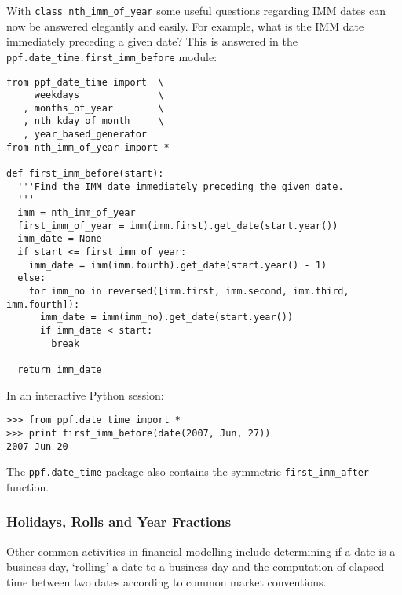 With \verb|class nth_imm_of_year| some useful questions regarding IMM
dates can now be answered elegantly and easily. For example, what is
the IMM date immediately preceding a given date? This is answered in
the \\ \verb|ppf.date_time.first_imm_before| module:
\begin{verbatim}
from ppf_date_time import  \
     weekdays              \
   , months_of_year        \
   , nth_kday_of_month     \
   , year_based_generator
from nth_imm_of_year import *

def first_imm_before(start):
  '''Find the IMM date immediately preceding the given date.
  '''
  imm = nth_imm_of_year
  first_imm_of_year = imm(imm.first).get_date(start.year())
  imm_date = None
  if start <= first_imm_of_year:
    imm_date = imm(imm.fourth).get_date(start.year() - 1)
  else:
    for imm_no in reversed([imm.first, imm.second, imm.third, imm.fourth]):
      imm_date = imm(imm_no).get_date(start.year())
      if imm_date < start:
        break

  return imm_date
\end{verbatim}
In an interactive Python session:
\begin{verbatim}
>>> from ppf.date_time import *
>>> print first_imm_before(date(2007, Jun, 27))
2007-Jun-20
\end{verbatim}
The \verb|ppf.date_time| package also contains the symmetric \verb|first_imm_after| function.
\subsubsection{Holidays, Rolls and Year Fractions}
Other common activities in financial modelling include determining if a
date is a business day, `rolling' a date to a business day and the
computation of elapsed time between two dates according to common
market conventions.


